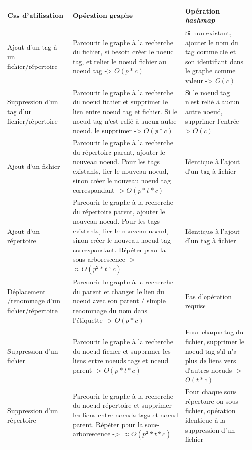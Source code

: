\documentclass[a4paper, 12pt]{article}
\begin{document}
\begin{center}
    \begin{tabularx}{16cm}{|p{3cm}|p{7cm}|X|} \hline
        \textbf{Cas d'utilisation} & \textbf{Opération graphe} & \textbf{Opération \textit{hashmap}} \\ \hline
        Ajout d'un tag à un fichier/répertoire & Parcourir le graphe à la recherche du fichier, 
            si besoin créer le noeud tag, et relier le noeud fichier au noeud tag -> $O(p * c)$ 
            & Si non existant, ajouter le nom du tag comme clé et son identifiant dans le graphe 
            comme valeur -> $O(c)$ \\ \hline
        Suppression d'un tag d'un fichier/répertoire & Parcourir le graphe à la recherche du 
            noeud fichier et supprimer le lien entre noeud tag et fichier. Si le noeud tag 
            n'est relié à aucun autre noeud, le supprimer -> $O(p * c)$ & Si le noeud tag 
            n'est relié à aucun autre noeud, supprimer l'entrée -> $O(c)$ \\ \hline
        Ajout d'un fichier & Parcourir le graphe à la recherche du répertoire parent, 
            ajouter le nouveau noeud. Pour les tags existants, lier le nouveau noeud, sinon créer 
            le nouveau noeud tag correspondant -> $O(p * t * c)$ & Identique à l'ajout d'un tag à 
            fichier \\ \hline
        Ajout d'un répertoire & Parcourir le graphe à la recherche du répertoire parent, 
            ajouter le nouveau noeud. Pour les tags existants, lier le nouveau noeud, sinon créer 
            le nouveau noeud tag correspondant. Répéter pour la sous-arborescence -> $\approx 
            O(p^2 * t * c)$ & Identique à l'ajout d'un tag à fichier \\ \hline
        Déplacement /renommage d'un fichier/répertoire & Parcourir le graphe à la recherche du parent et 
            changer le lien du noeud avec son parent / simple renommage du nom dans 
            l'étiquette -> $O(p * c)$ & Pas d'opération requise \\ \hline
        Suppression d'un fichier & Parcourir le graphe à la recherche du noeud fichier et supprimer les 
            liens entre noeuds tags et noeud parent -> $O(p * t * c)$ & Pour chaque tag du fichier, 
            supprimer le noeud tag s'il n'a plus de liens vers d'autres noeuds -> $O(t * c)$ \\ \hline
        Suppression d'un répertoire & Parcourir le graphe à la recherche du noeud répertoire et supprimer les 
            liens entre noeuds tags et noeud parent. Répéter pour la sous-arborescence -> $\approx 
            O(p^2 * t * c)$ & Pour chaque sous répertoire ou sous fichier, opération identique à 
            la suppression d'un fichier \\ \hline
    \end{tabularx}
    \label{tableau_architecture_2}
\end{center}
\end{document}
